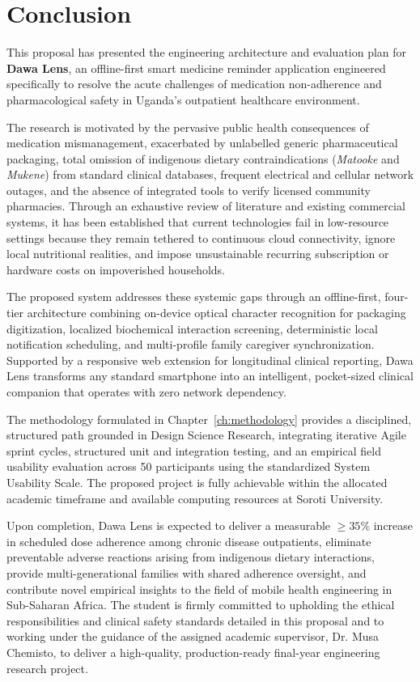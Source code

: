 \chapter{Conclusion}
\label{ch:conclusion}

This proposal has presented the engineering architecture and evaluation plan for \textbf{Dawa Lens}, an offline-first smart medicine reminder application engineered specifically to resolve the acute challenges of medication non-adherence and pharmacological safety in Uganda's outpatient healthcare environment.

The research is motivated by the pervasive public health consequences of medication mismanagement, exacerbated by unlabelled generic pharmaceutical packaging, total omission of indigenous dietary contraindications (\textit{Matooke} and \textit{Mukene}) from standard clinical databases, frequent electrical and cellular network outages, and the absence of integrated tools to verify licensed community pharmacies. Through an exhaustive review of literature and existing commercial systems, it has been established that current technologies fail in low-resource settings because they remain tethered to continuous cloud connectivity, ignore local nutritional realities, and impose unsustainable recurring subscription or hardware costs on impoverished households.

The proposed system addresses these systemic gaps through an offline-first, four-tier architecture combining on-device optical character recognition for packaging digitization, localized biochemical interaction screening, deterministic local notification scheduling, and multi-profile family caregiver synchronization. Supported by a responsive web extension for longitudinal clinical reporting, Dawa Lens transforms any standard smartphone into an intelligent, pocket-sized clinical companion that operates with zero network dependency.

The methodology formulated in Chapter~\ref{ch:methodology} provides a disciplined, structured path grounded in Design Science Research, integrating iterative Agile sprint cycles, structured unit and integration testing, and an empirical field usability evaluation across 50 participants using the standardized System Usability Scale. The proposed project is fully achievable within the allocated academic timeframe and available computing resources at Soroti University.

Upon completion, Dawa Lens is expected to deliver a measurable $\ge 35\%$ increase in scheduled dose adherence among chronic disease outpatients, eliminate preventable adverse reactions arising from indigenous dietary interactions, provide multi-generational families with shared adherence oversight, and contribute novel empirical insights to the field of mobile health engineering in Sub-Saharan Africa. The student is firmly committed to upholding the ethical responsibilities and clinical safety standards detailed in this proposal and to working under the guidance of the assigned academic supervisor, Dr. Musa Chemisto, to deliver a high-quality, production-ready final-year engineering research project.